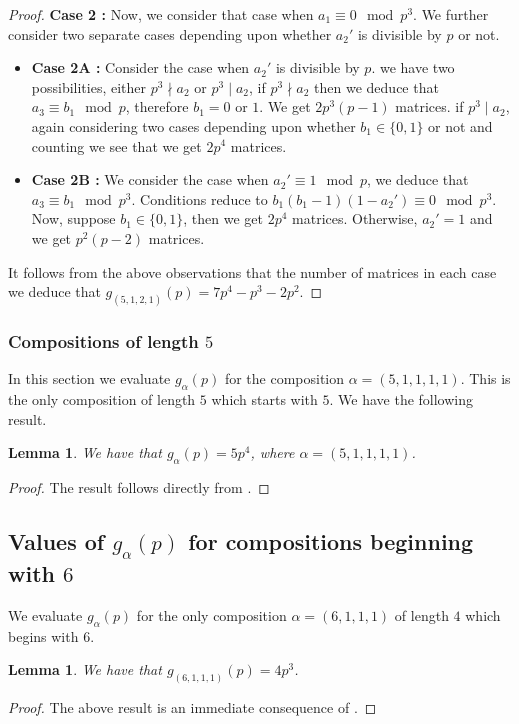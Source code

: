 \documentclass[a4paper]{amsart}
\newtheorem{lemma}[theorem]{Lemma}
\numberwithin{equation}{section}
\theoremstyle{remark}
\begin{document}
\begin{proof}
    \par \textbf{Case 2 :} Now, we consider that case when $a_1 \equiv 0 \mod p^3$. We further consider two separate cases depending upon whether $a_2'$ is divisible by $p$ or not.
    \begin{itemize}
        \item \textbf{Case 2A :} Consider the case when $a_2'$ is divisible by $p$. we have two possibilities, either $p^3 \nmid a_2$ or $p^3 \mid a_2$, if $p^3 \nmid a_2$ then we deduce that $a_3 \equiv b_1 \mod p$, therefore $b_1 = 0$ or $1$. We get $2p^3(p-1)$ matrices. if $p^3 \mid a_2$, again considering two cases depending upon whether $b_1 \in \{0,1\}$ or not and counting we see that we get $2p^4$ matrices.
        \item \textbf{Case 2B :} We consider the case when $a_2' \equiv 1 \mod p$, we deduce that $a_3 \equiv b_1 \mod p^3$. Conditions reduce to $b_1(b_1-1)(1-a_2') \equiv 0 \mod p^3$. Now, suppose $b_1 \in \{0,1\}$, then we get $2p^4$ matrices. Otherwise, $a_2' = 1$ and we get $p^2(p-2)$ matrices. 
    \end{itemize}
    It follows from the above observations that the number of matrices in each case we deduce that $g_{(5,1,2,1)}(p) = 7 p^4 - p^3 - 2 p^2$.
\end{proof}

\subsubsection{Compositions of length $5$}In this section we evaluate $g_{\alpha}(p)$ for the composition $\alpha = (5,1,1,1,1)$. This is the only composition of length $5$ which starts with $5$. We have the following result.
\begin{lemma}
We have that $g_{\alpha}(p) = 5p^4$, where $\alpha = (5,1,1,1,1)$.
\end{lemma}
\begin{proof}
The result follows directly from \cite[Lemma 3.5]{atanasov2021counting}.
\end{proof}


\subsection{Values of $g_\alpha(p)$ for compositions beginning with $6$}
We evaluate $g_{\alpha}(p)$ for the only composition $\alpha = (6,1,1,1)$ of length $4$ which begins with $6$.
\begin{lemma}
We have that $g_{(6,1,1,1)}(p) = 4p^3$.
\end{lemma}
\begin{proof}
The above result is an immediate consequence of \cite[Lemma 3.5]{atanasov2021counting}.
\end{proof}
\end{document}
